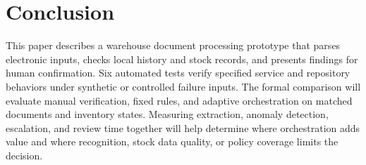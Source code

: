 \documentclass[conference]{IEEEtran}
\begin{document}
\section{Conclusion}
This paper describes a warehouse document processing prototype that parses electronic inputs, checks local history and stock records, and presents findings for human confirmation. Six automated tests verify specified service and repository behaviors under synthetic or controlled failure inputs. The formal comparison will evaluate manual verification, fixed rules, and adaptive orchestration on matched documents and inventory states. Measuring extraction, anomaly detection, escalation, and review time together will help determine where orchestration adds value and where recognition, stock data quality, or policy coverage limits the decision.
\end{document}
